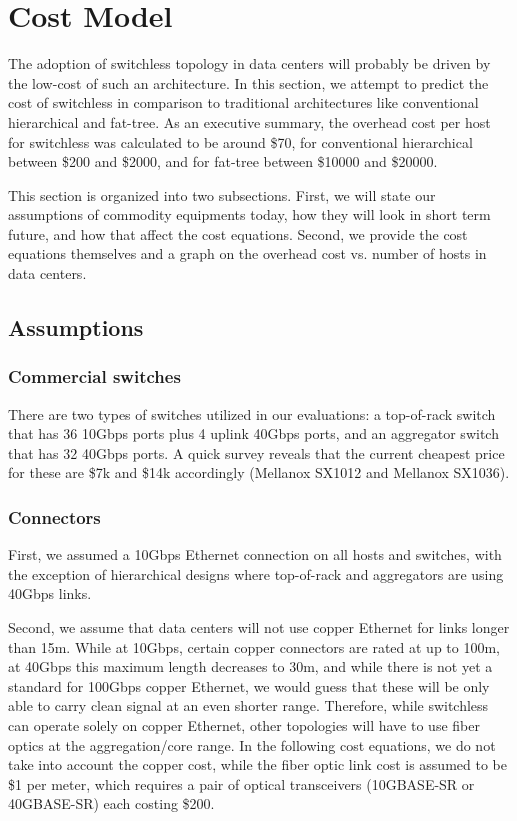 \section{Cost Model}
\label{sec:cost_model}

The adoption of switchless topology in data centers will probably be driven by the low-cost of such an architecture. In this section, we attempt to predict the cost of switchless in comparison to traditional architectures like conventional hierarchical and fat-tree. As an executive summary, the overhead cost per host for switchless was calculated to be around \$70, for conventional hierarchical between \$200 and \$2000, and for fat-tree between \$10000 and \$20000.

This section is organized into two subsections. First, we will state our assumptions of commodity equipments today, how they will look in short term future, and how that affect the cost equations. Second, we provide the cost equations themselves and a graph on the overhead cost vs. number of hosts in data centers.

\subsection{Assumptions}


\subsubsection{Commercial switches}
There are two types of switches utilized in our evaluations: a top-of-rack switch that has 36 10Gbps ports plus 4 uplink 40Gbps ports, and an aggregator switch that has 32 40Gbps ports. A quick survey reveals that the current cheapest price for these are \$7k and \$14k accordingly (Mellanox SX1012 and Mellanox SX1036).

\subsubsection{Connectors}
First, we assumed a 10Gbps Ethernet connection on all hosts and switches, with the exception of hierarchical designs where top-of-rack and aggregators are using 40Gbps links.

Second, we assume that data centers will not use copper Ethernet for links longer than 15m. While at 10Gbps, certain copper connectors are rated at up to 100m, at 40Gbps this maximum length decreases to 30m, and while there is not yet a standard for 100Gbps copper Ethernet, we would guess that these will be only able to carry clean signal at an even shorter range. Therefore, while switchless can operate solely on copper Ethernet, other topologies will have to use fiber optics at the aggregation/core range. In the following cost equations, we do not take into account the copper cost, while the fiber optic link cost is assumed to be \$1 per meter, which requires a pair of optical transceivers (10GBASE-SR or 40GBASE-SR) each costing \$200.


